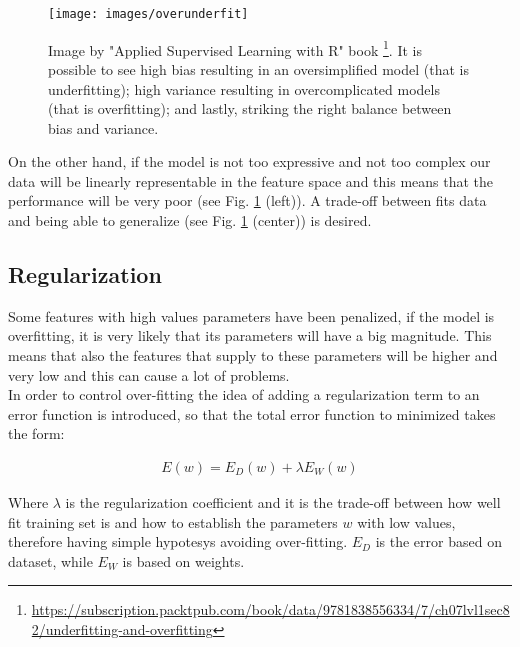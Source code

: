 \begin{figure}[H]
	\begin{minipage}{\textwidth}
		\centering
		\texttt{[image: images/overunderfit]}
		\caption[Overfitting and Underfitting.]{Image by "Applied Supervised Learning with R" book \footnote{\url{https://subscription.packtpub.com/book/data/9781838556334/7/ch07lvl1sec82/underfitting-and-overfitting}}. It is possible to see high bias resulting in an oversimplified model (that is underfitting); high variance resulting in overcomplicated models (that is overfitting); and lastly, striking the right balance between bias and variance.}
		\label{fig:overunderfit}
	\end{minipage}
\end{figure}

\noindent On the other hand, if the model is not too expressive and not too complex our data will be linearly representable in the feature space and this means that the performance will be very poor (see Fig. \ref{fig:overunderfit} (left)). A trade-off between fits data and being able to generalize (see Fig. \ref{fig:overunderfit} (center)) is desired.

\subsection{Regularization}
Some features with high values parameters have been penalized, if the model is overfitting, it is very likely that its parameters will have a big magnitude. This means that also the features that supply to these parameters will be higher and very low and this can cause a lot of problems. \\

\noindent In order to control over-fitting the idea of adding a regularization term to an error function is introduced, so that the total error function to minimized takes the form:

\begin{Equation}[H]
	\centering
	\begin{equation}\label{eq:fullreg}
		\begin{aligned}
			E(w) = E_D(w) + \lambda E_W(w)
		\end{aligned}
	\end{equation}
\end{Equation}

\noindent Where $\lambda$ is the regularization coefficient and it is the trade-off between how well fit training set is and how to establish the parameters $w$ with low values, therefore having simple hypotesys avoiding over-fitting. $E_D$ is the error based on dataset, while $E_W$ is based on weights.

